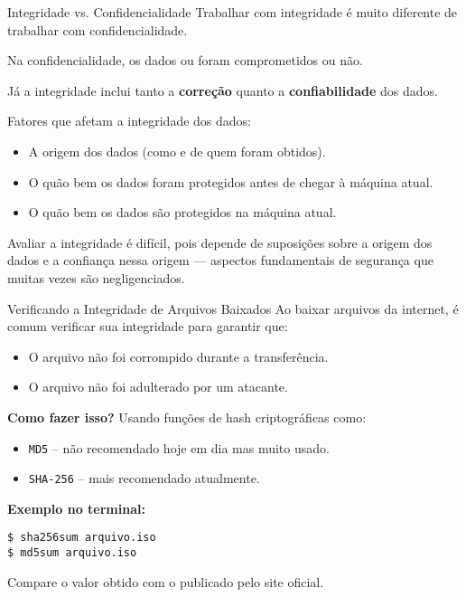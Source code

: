 \begin{frame}{Integridade vs. Confidencialidade}
  Trabalhar com integridade é muito diferente de trabalhar com confidencialidade.

  \vspace{0.3cm}
  Na confidencialidade, os dados ou foram comprometidos ou não.

  \vspace{0.3cm}
  Já a integridade inclui tanto a \textbf{correção} quanto a \textbf{confiabilidade} dos dados.

  \vspace{0.3cm}
  Fatores que afetam a integridade dos dados:
  \begin{itemize}
    \item A origem dos dados (como e de quem foram obtidos).
    \item O quão bem os dados foram protegidos antes de chegar à máquina atual.
    \item O quão bem os dados são protegidos na máquina atual.
  \end{itemize}

  \vspace{0.3cm}
  Avaliar a integridade é difícil, pois depende de suposições sobre a origem dos dados e a confiança nessa origem — aspectos fundamentais de segurança que muitas vezes são negligenciados.
\end{frame}
\begin{frame}[fragile]{Verificando a Integridade de Arquivos Baixados}
  Ao baixar arquivos da internet, é comum verificar sua integridade para garantir que:

  \begin{itemize}
    \item O arquivo não foi corrompido durante a transferência.
    \item O arquivo não foi adulterado por um atacante.
  \end{itemize}

  \vspace{0.3cm}
  \textbf{Como fazer isso?} Usando funções de hash criptográficas como:

  \begin{itemize}
    \item \texttt{MD5} -- não recomendado hoje em dia mas muito usado.
    \item \texttt{SHA-256} -- mais  recomendado atualmente.
  \end{itemize}

  \vspace{0.3cm}
  \textbf{Exemplo no terminal:}

  \begin{verbatim}
$ sha256sum arquivo.iso
$ md5sum arquivo.iso
\end{verbatim}

  Compare o valor obtido com o publicado pelo site oficial.
\end{frame}


